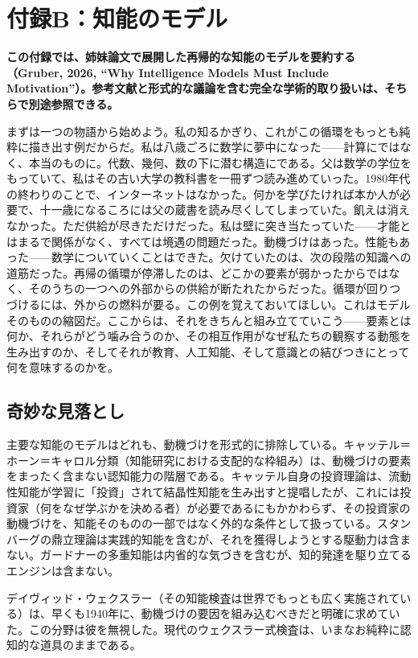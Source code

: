 \documentclass[11pt, twoside, openright]{book}
\begin{document}
\chapter*{付録B：知能のモデル}

\textbf{この付録では、姉妹論文で展開した再帰的な知能のモデルを要約する（Gruber, 2026, ``Why Intelligence Models Must Include Motivation''）。参考文献と形式的な議論を含む完全な学術的取り扱いは、そちらで別途参照できる。}

まずは一つの物語から始めよう。私の知るかぎり、これがこの循環をもっとも純粋に描き出す例だからだ。私は八歳ごろに数学に夢中になった------計算にではなく、本当のものに。代数、幾何、数の下に潜む構造にである。父は数学の学位をもっていて、私はその古い大学の教科書を一冊ずつ読み進めていった。1980年代の終わりのことで、インターネットはなかった。何かを学びたければ本か人が必要で、十一歳になるころには父の蔵書を読み尽くしてしまっていた。飢えは消えなかった。ただ供給が尽きただけだった。私は壁に突き当たっていた------才能とはまるで関係がなく、すべては境遇の問題だった。動機づけはあった。性能もあった------数学についていくことはできた。欠けていたのは、次の段階の知識への道筋だった。再帰の循環が停滞したのは、どこかの要素が弱かったからではなく、そのうちの一つへの外部からの供給が断たれたからだった。循環が回りつづけるには、外からの燃料が要る。この例を覚えておいてほしい。これはモデルそのものの縮図だ。ここからは、それをきちんと組み立てていこう------要素とは何か、それらがどう噛み合うのか、その相互作用がなぜ私たちの観察する動態を生み出すのか、そしてそれが教育、人工知能、そして意識との結びつきにとって何を意味するのかを。

\section*{奇妙な見落とし}

主要な知能のモデルはどれも、動機づけを形式的に排除している。キャッテル＝ホーン＝キャロル分類（知能研究における支配的な枠組み）は、動機づけの要素をまったく含まない認知能力の階層である。キャッテル自身の投資理論は、流動性知能が学習に「投資」されて結晶性知能を生み出すと提唱したが、これには投資家（何をなぜ学ぶかを決める者）が必要であるにもかかわらず、その投資家の動機づけを、知能そのものの一部ではなく外的な条件として扱っている。スタンバーグの鼎立理論は実践的知能を含むが、それを獲得しようとする駆動力は含まない。ガードナーの多重知能は内省的な気づきを含むが、知的発達を駆り立てるエンジンは含まない。

デイヴィッド・ウェクスラー（その知能検査は世界でもっとも広く実施されている）は、早くも1940年に、動機づけの要因を組み込むべきだと明確に求めていた。この分野は彼を無視した。現代のウェクスラー式検査は、いまなお純粋に認知的な道具のままである。
\end{document}

